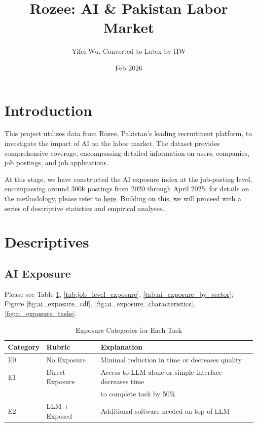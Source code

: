 \documentclass[12pt]{article}
\title{Rozee: AI \& Pakistan Labor Market}
\author{Yifei Wu, Converted to Latex by HW}
\date{Feb 2026}
\begin{document}
\maketitle
\tableofcontents
\listoffigures
\listoftables
\clearpage

\section{Introduction}

This project utilizes data from Rozee, Pakistan's leading recruitment platform, to
investigate the impact of AI on the labor market. The dataset provides
comprehensive coverage, encompassing detailed information on users, companies, job
postings, and job applications.

At this stage, we have constructed the AI exposure index at the job-posting level,
encompassing around 300k postings from 2020 through April 2025; for details on
the methodology, please refer to \href{https://www.dropbox.com/scl/fi/uqi6zjdkaz9e7wlg5p04j/AI-Pakistan-LM-Presentation.pptx?rlkey=2xudrhus8cz26kf3xi7oix7fp&e=2&st=mdsvydvb&dl=0}{here}. Building on this, we will proceed with a
series of descriptive statistics and empirical analyses.

\section{Descriptives}

\subsection*{AI Exposure}

Please see Table \ref{tab:exposure_categories}, \ref{tab:job_level_exposure},
\ref{tab:ai_exposure_by_sector}; Figure \ref{fig:ai_exposure_cdf},
\ref{fig:ai_exposure_characteristics}, \ref{fig:ai_exposure_tasks}.

\begin{table}[h]
\centering
\caption{Exposure Categories for Each Task}
\label{tab:exposure_categories}
\begin{tabular}{lll}
\toprule
Category & Rubric & Explanation \\
\midrule
E0 & No Exposure & Minimal reduction in time or decreases quality \\
E1 & Direct Exposure & Access to LLM alone or simple interface decreases time \\
   &                 & to complete task by 50\% \\
E2 & LLM + Exposed  & Additional software needed on top of LLM \\
\bottomrule
\end{tabular}
\end{table}
\end{document}
